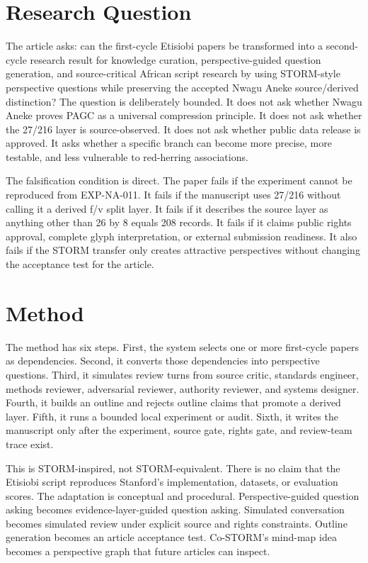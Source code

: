 \documentclass[sigconf,nonacm]{acmart}
\begin{document}
\section{Research Question}
The article asks: can the first-cycle Etisiobi papers be transformed into a
second-cycle research result for knowledge curation, perspective-guided question generation, and source-critical African script research by using STORM-style perspective
questions while preserving the accepted Nwagu Aneke source/derived distinction?
The question is deliberately bounded. It does not ask whether Nwagu Aneke proves
PAGC as a universal compression principle. It does not ask whether the 27/216
layer is source-observed. It does not ask whether public data release is
approved. It asks whether a specific branch can become more precise, more
testable, and less vulnerable to red-herring associations.

The falsification condition is direct. The paper fails if the experiment cannot
be reproduced from EXP-NA-011. It fails if the manuscript uses 27/216 without
calling it a derived f/v split layer. It fails if it describes the source layer
as anything other than 26 by 8 equals 208 records. It fails if it claims public
rights approval, complete glyph interpretation, or external submission readiness.
It also fails if the STORM transfer only creates attractive perspectives without
changing the acceptance test for the article.

\section{Method}
The method has six steps. First, the system selects one or more first-cycle
papers as dependencies. Second, it converts those dependencies into perspective
questions. Third, it simulates review turns from source critic, standards
engineer, methods reviewer, adversarial reviewer, authority reviewer, and
systems designer. Fourth, it builds an outline and rejects outline claims that
promote a derived layer. Fifth, it runs a bounded local experiment or audit.
Sixth, it writes the manuscript only after the experiment, source gate, rights
gate, and review-team trace exist.

This is STORM-inspired, not STORM-equivalent. There is no claim that the
Etisiobi script reproduces Stanford's implementation, datasets, or evaluation
scores. The adaptation is conceptual and procedural. Perspective-guided question
asking becomes evidence-layer-guided question asking. Simulated conversation
becomes simulated review under explicit source and rights constraints. Outline
generation becomes an article acceptance test. Co-STORM's mind-map idea becomes
a perspective graph that future articles can inspect.
\end{document}
